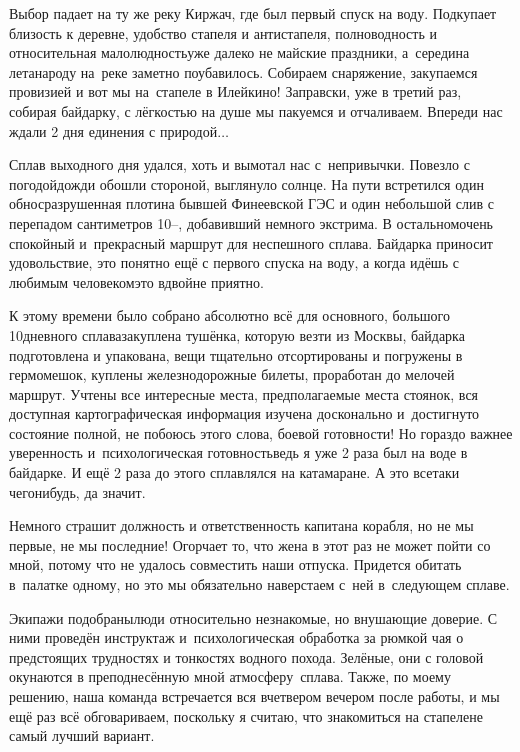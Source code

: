 \newpage
Выбор падает на ту же реку Киржач, где был первый спуск на воду. Подкупает близость к деревне, удобство стапеля и антистапеля, полноводность и относительная малолюдность\mdash уже далеко не майские праздники, а~середина лета\mdash народу на~реке заметно поубавилось. Собираем снаряжение, закупаемся провизией и вот мы на~стапеле в Илейкино! Заправски, уже в третий раз, собирая байдарку, с лёгкостью на душе мы пакуемся и отчаливаем. Впереди нас ждали 2 дня единения с природой$\ldots$

Сплав выходного дня удался, хоть и вымотал нас с~непривычки. Повезло с погодой\mdash дожди обошли стороной, выглянуло солнце. На пути встретился один обнос\mdash разрушенная плотина бывшей Финеевской ГЭС и один небольшой слив с перепадом сантиметров 10\thinspace\nobreakdash--, добавивший немного экстрима. В остальном\mdash очень спокойный и~прекрасный маршрут для неспешного сплава. Байдарка приносит удовольствие, это понятно ещё с первого спуска на воду, а когда идёшь с любимым человеком\mdash это вдвойне приятно.

К этому времени было собрано абсолютно всё для основного, большого 10\sdash дневного сплава\mdash закуплена тушёнка, которую везти из Москвы, байдарка подготовлена и упакована, вещи тщательно отсортированы и погружены в гермомешок, куплены железнодорожные билеты, проработан до мелочей маршрут. Учтены все интересные места, предполагаемые места стоянок, вся доступная картографическая информация изучена досконально и~достигнуто состояние полной, не побоюсь этого слова, боевой готовности! Но гораздо  важнее уверенность и~психологическая готовность\mdash ведь я уже 2 раза был на воде в байдарке. И ещё 2 раза до этого сплавлялся на катамаране. А это все\sdash таки чего\sdash нибудь, да значит. 

Немного страшит должность и ответственность капитана корабля, но не мы первые, не мы последние! Огорчает то, что жена в этот раз не может пойти со мной, потому что не удалось совместить наши отпуска. Придется обитать в~палатке одному, но это мы обязательно наверстаем с~ней в~следующем сплаве. 

Экипажи подобраны\mdash люди относительно незнакомые, но внушающие доверие. С ними проведён инструктаж и~психологическая обработка за рюмкой чая о предстоящих трудностях и тонкостях водного похода. Зелёные, они с головой окунаются в преподнесённую мной атмосферу~сплава. Также, по моему решению, наша команда встречается вся вчетвером вечером после работы, и мы ещё раз всё обговариваем, поскольку я считаю, что знакомиться на стапеле\mdash не самый лучший вариант.

